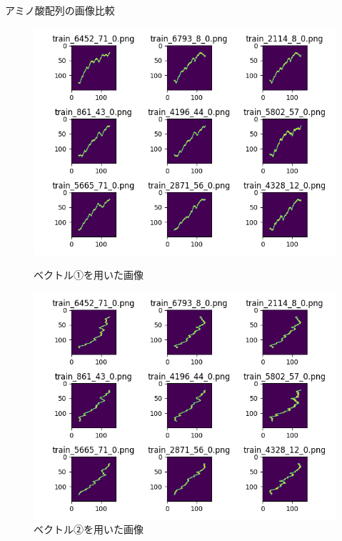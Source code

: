 \documentclass[dvipdfmx]{beamer}
\begin{document}
  \begin{frame}{アミノ酸配列の画像比較}
    \begin{figure}[htbp]
      \begin{minipage}[b]{0.45\linewidth}
        \centering
        \includegraphics[keepaspectratio, scale=0.3]{images/amino_img_classA.png}
        \caption{\newline ベクトル①を用いた画像}
      \end{minipage}
      \begin{minipage}[b]{0.45\linewidth}
        \centering
        \includegraphics[keepaspectratio, scale=0.3]{images/my_amino_img_classA.png}
        \caption{\newline ベクトル②を用いた画像}
      \end{minipage}
    \end{figure}
  \end{frame}
\end{document}
